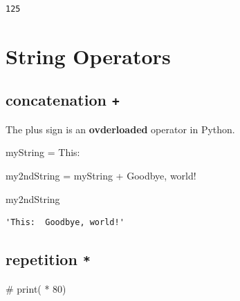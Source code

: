 \documentclass[
  letterpaper,
  DIV=11,
  numbers=noendperiod]{scrreprt}
\newenvironment{Shaded}{\begin{snugshade}}{\end{snugshade}}
\newcommand{\CommentTok}[1]{\textcolor[rgb]{0.37,0.37,0.37}{#1}}
\newcommand{\NormalTok}[1]{\textcolor[rgb]{0.00,0.23,0.31}{#1}}
\newcommand{\OperatorTok}[1]{\textcolor[rgb]{0.37,0.37,0.37}{#1}}
\newcommand{\StringTok}[1]{\textcolor[rgb]{0.13,0.47,0.30}{#1}}
\begin{document}
\begin{verbatim}
125
\end{verbatim}

\hypertarget{string-operators}{%
\section{String Operators}\label{string-operators}}

\hypertarget{concatenation}{%
\subsection{\texorpdfstring{concatenation
\texttt{+}}{concatenation +}}\label{concatenation}}

The plus sign is an \textbf{ovderloaded} operator in Python.

\begin{Shaded}
\begin{Highlighting}[]
\NormalTok{myString }\OperatorTok{=} \StringTok{\textquotesingle{}This: \textquotesingle{}}
\end{Highlighting}
\end{Shaded}

\begin{Shaded}
\begin{Highlighting}[]
\NormalTok{my2ndString }\OperatorTok{=}\NormalTok{ myString }\OperatorTok{+} \StringTok{\textquotesingle{} Goodbye, world!\textquotesingle{}}
\end{Highlighting}
\end{Shaded}

\begin{Shaded}
\begin{Highlighting}[]
\NormalTok{my2ndString}
\end{Highlighting}
\end{Shaded}

\begin{verbatim}
'This:  Goodbye, world!'
\end{verbatim}

\hypertarget{repetition}{%
\subsection{\texorpdfstring{repetition
\texttt{*}}{repetition *}}\label{repetition}}

\begin{Shaded}
\begin{Highlighting}[]
\CommentTok{\# print(\textquotesingle{}{-}\textquotesingle{} * 80)}
\end{Highlighting}
\end{Shaded}
\end{document}
